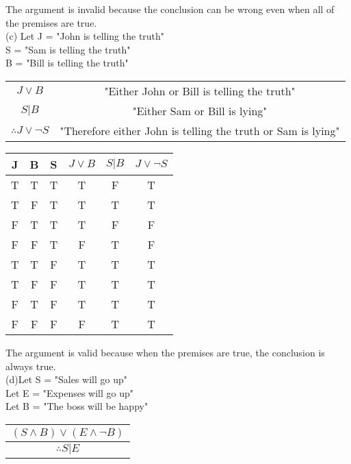 \documentclass{article}
\begin{document}
 \vspace{2em}
 \linebreak
 The argument is invalid because the conclusion can be wrong even when all of the premises are true.\\
 \linebreak
 (c) Let J = "John is telling the truth"\\
         S = "Sam is telling the truth"\\
         B = "Bill is telling the truth"\\
         
  \begin{tabular}{cc}
  $J \vee B$& "Either John or Bill is telling the truth"\\
  $S | B$  &  "Either Sam or Bill is lying"\\
  \hline
  $\therefore J \vee \neg S$& "Therefore either John is telling the truth or Sam is lying"\\
  \end{tabular}         
  \vspace{2em}
 \linebreak
 \begin{tabular}{cccccc}
 J&B&S&$J \vee B$&$S | B$&$J \vee \neg S$\\
  \hline
 T&T&T&T&F&T\\
 T&F&T&T&T&T\\
 F&T&T&T&F&F\\
 F&F&T&F&T&F\\
 T&T&F&T&T&T\\
 T&F&F&T&T&T\\
 F&T&F&T&T&T\\
 F&F&F&F&T&T\\
 \end{tabular}
   \vspace{2em}
 \linebreak
 The argument is valid because when the premises are true, the conclusion is always true.\\
 \linebreak
 (d)Let S = "Sales will go up"\\
 Let E = "Expenses will go up"\\
 Let B = "The boss will be happy"\\
 \begin{tabular}{c}
 $(S \wedge B) \vee (E \wedge \neg B)$\\
 \hline
 $\therefore S | E$\\
 \end{tabular}
  \vspace{2em}
\end{document}
